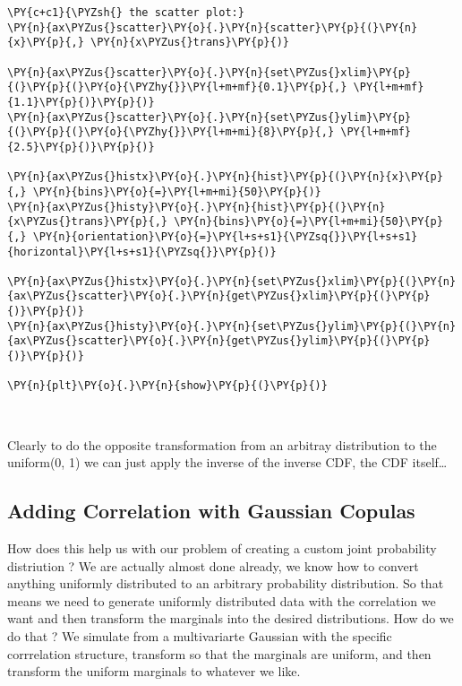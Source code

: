 \begin{tcolorbox}[breakable, size=fbox, boxrule=1pt, pad at break*=1mm,colback=cellbackground, colframe=cellborder]
\begin{Verbatim}[commandchars=\\\{\}]
\PY{c+c1}{\PYZsh{} the scatter plot:}
\PY{n}{ax\PYZus{}scatter}\PY{o}{.}\PY{n}{scatter}\PY{p}{(}\PY{n}{x}\PY{p}{,} \PY{n}{x\PYZus{}trans}\PY{p}{)}

\PY{n}{ax\PYZus{}scatter}\PY{o}{.}\PY{n}{set\PYZus{}xlim}\PY{p}{(}\PY{p}{(}\PY{o}{\PYZhy{}}\PY{l+m+mf}{0.1}\PY{p}{,} \PY{l+m+mf}{1.1}\PY{p}{)}\PY{p}{)}
\PY{n}{ax\PYZus{}scatter}\PY{o}{.}\PY{n}{set\PYZus{}ylim}\PY{p}{(}\PY{p}{(}\PY{o}{\PYZhy{}}\PY{l+m+mi}{8}\PY{p}{,} \PY{l+m+mf}{2.5}\PY{p}{)}\PY{p}{)}

\PY{n}{ax\PYZus{}histx}\PY{o}{.}\PY{n}{hist}\PY{p}{(}\PY{n}{x}\PY{p}{,} \PY{n}{bins}\PY{o}{=}\PY{l+m+mi}{50}\PY{p}{)}
\PY{n}{ax\PYZus{}histy}\PY{o}{.}\PY{n}{hist}\PY{p}{(}\PY{n}{x\PYZus{}trans}\PY{p}{,} \PY{n}{bins}\PY{o}{=}\PY{l+m+mi}{50}\PY{p}{,} \PY{n}{orientation}\PY{o}{=}\PY{l+s+s1}{\PYZsq{}}\PY{l+s+s1}{horizontal}\PY{l+s+s1}{\PYZsq{}}\PY{p}{)}

\PY{n}{ax\PYZus{}histx}\PY{o}{.}\PY{n}{set\PYZus{}xlim}\PY{p}{(}\PY{n}{ax\PYZus{}scatter}\PY{o}{.}\PY{n}{get\PYZus{}xlim}\PY{p}{(}\PY{p}{)}\PY{p}{)}
\PY{n}{ax\PYZus{}histy}\PY{o}{.}\PY{n}{set\PYZus{}ylim}\PY{p}{(}\PY{n}{ax\PYZus{}scatter}\PY{o}{.}\PY{n}{get\PYZus{}ylim}\PY{p}{(}\PY{p}{)}\PY{p}{)}

\PY{n}{plt}\PY{o}{.}\PY{n}{show}\PY{p}{(}\PY{p}{)}
\end{Verbatim}
\end{tcolorbox}

    \begin{center}
    \end{center}
    { \hspace*{\fill} \\}
    
    Clearly to do the opposite transformation from an arbitray distribution
to the uniform(0, 1) we can just apply the inverse of the inverse CDF,
the CDF itself\ldots{}

\subsection{Adding Correlation with Gaussian
Copulas}\label{adding-correlation-with-gaussian-copulas}

How does this help us with our problem of creating a custom joint
probability distriution ? We are actually almost done already, we know
how to convert anything uniformly distributed to an arbitrary
probability distribution. So that means we need to generate uniformly
distributed data with the correlation we want and then transform the
marginals into the desired distributions. How do we do that ? We
simulate from a multivariarte Gaussian with the specific corrrelation
structure, transform so that the marginals are uniform, and then
transform the uniform marginals to whatever we like.

